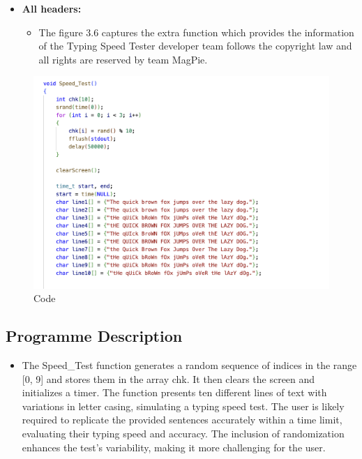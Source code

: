 \begin{itemize}
    \item \textbf{All headers:}
    \begin{itemize}
        \item
        The figure 3.6 captures the extra function which provides the information of the Typing Speed Tester developer team follows the copyright law and all rights are reserved by  team MagPie.
    \end{itemize}
\end{itemize}
\newpage
\begin{figure}[h]
     \includegraphics[scale=0.25]{CodeScreenShot/speedtest-1.png}
    \caption{Code}
    \label{fig:code-screenshots}
\end{figure}

\subsection{Programme Description}

    \begin{itemize}
        \item The Speed\_Test function generates a random sequence of indices in the range [0, 9] and stores them in the array chk. It then clears the screen and initializes a timer. The function presents ten different lines of text with variations in letter casing, simulating a typing speed test. The user is likely required to replicate the provided sentences accurately within a time limit, evaluating their typing speed and accuracy. The inclusion of randomization enhances the test's variability, making it more challenging for the user.
    \end{itemize}
\newpage

